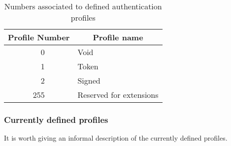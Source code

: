\documentclass{rfc}
\begin{document}
\begin{table}
\caption{Numbers associated to defined authentication profiles
\label{table:auth_profiles}}
  \begin{center}
    \begin{tabular}{|c|l|}
\hline
    \multicolumn{1}{|p{3.3em}}{Profile Number} &
    \multicolumn{1}{|c|}{Profile name} \\
\hline
\hline
  ~~0 & Void  \\ \hline
  ~~1 & Token \\ \hline
  ~~2 & Signed \\ \hline
  255 & Reserved for extensions \\ 
\hline
    \end{tabular}
  \end{center}
\end{table}

\subsubsection{Currently defined profiles}

It is worth  giving an informal description of the currently defined
profiles. 
\end{document}

